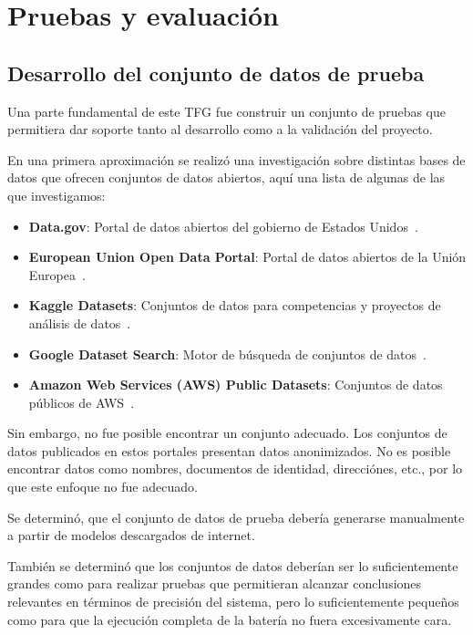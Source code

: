 \section{Pruebas y evaluación}\label{sec:pruebas_y_evaluacion}

\subsection{Desarrollo del conjunto de datos de prueba}

Una parte fundamental de este TFG fue construir un conjunto de pruebas que permitiera dar soporte tanto al
desarrollo como a la validación del proyecto.

En una primera aproximación se realizó una investigación sobre distintas bases de datos que ofrecen
conjuntos de datos abiertos, aquí una lista de algunas de las que investigamos:

\begin{itemize}
    \item \textbf{Data.gov}: Portal de datos abiertos del gobierno de Estados Unidos~\cite{url_us_open_data}.
    \item \textbf{European Union Open Data Portal}: Portal de datos abiertos de la Unión
    Europea~\cite{url_eu_open_data}.
    \item \textbf{Kaggle Datasets}: Conjuntos de datos para competencias y proyectos de análisis de
    datos~\cite{url_kaggle}.
    \item \textbf{Google Dataset Search}: Motor de búsqueda de conjuntos de
    datos~\cite{url_google_open_data}.
    \item \textbf{Amazon Web Services (AWS) Public Datasets}: Conjuntos de datos públicos de
    AWS~\cite{url_aws_open_data}.
\end{itemize}

Sin embargo, no fue posible encontrar un conjunto adecuado.
Los conjuntos de datos publicados en estos portales presentan datos anonimizados.
No es posible encontrar datos como nombres, documentos de identidad, direcciónes, etc., por lo que este enfoque no fue
adecuado.

Se determinó, que el conjunto de datos de prueba debería generarse manualmente a partir de modelos descargados de
internet.

También se determinó que los conjuntos de datos deberían ser lo suficientemente grandes como para realizar pruebas que
permitieran alcanzar conclusiones relevantes en términos de precisión del sistema, pero lo suficientemente pequeños
como para que la ejecución completa de la batería no fuera excesivamente cara.

